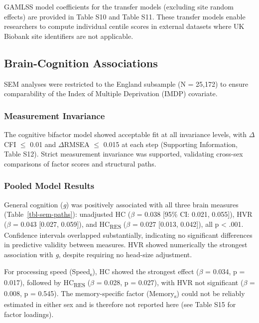 \documentclass[
]{article}
\begin{document}
GAMLSS model coefficients for the transfer models (excluding site random
effects) are provided in Table S10 and Table S11. These transfer models
enable researchers to compute individual centile scores in external
datasets where UK Biobank site identifiers are not applicable.

\subsection{Brain-Cognition
Associations}\label{brain-cognition-associations-1}

SEM analyses were restricted to the England subsample (N = 25,172) to
ensure comparability of the Index of Multiple Deprivation (IMDP)
covariate.

\subsubsection{Measurement Invariance}\label{measurement-invariance-1}

The cognitive bifactor model showed acceptable fit at all invariance
levels, with \(\Delta\)CFI \(\leq\) 0.01 and \(\Delta\)RMSEA \(\leq\)
0.015 at each step (Supporting Information, Table S12). Strict
measurement invariance was supported, validating cross-sex comparisons
of factor scores and structural paths.

\subsubsection{Pooled Model Results}\label{pooled-model-results}

General cognition (\emph{g}) was positively associated with all three
brain measures (Table~\ref{tbl-sem-paths}): unadjusted HC (\(\beta\) =
0.038 {[}95\% CI: 0.021, 0.055{]}), HVR (\(\beta\) = 0.043 {[}0.027,
0.059{]}), and HC\textsubscript{RES} (\(\beta\) = 0.027 {[}0.013,
0.042{]}), all p \textless{} .001. Confidence intervals overlapped
substantially, indicating no significant differences in predictive
validity between measures. HVR showed numerically the strongest
association with \emph{g}, despite requiring no head-size adjustment.

For processing speed (Speed\textsubscript{s}), HC showed the strongest
effect (\(\beta\) = 0.034, p = 0.017), followed by HC\textsubscript{RES}
(\(\beta\) = 0.028, p = 0.027), with HVR not significant (\(\beta\) =
0.008, p = 0.545). The memory-specific factor (Memory\textsubscript{s})
could not be reliably estimated in either sex and is therefore not
reported here (see Table S15 for factor loadings).
\end{document}
